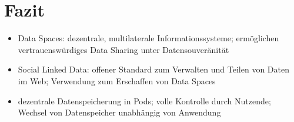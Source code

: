 
\section{Fazit}

\begin{itemize}

    \item Data Spaces: dezentrale, multilaterale Informationssysteme; ermöglichen vertrauenswürdiges Data Sharing unter Datensouveränität

    \item Social Linked Data: offener Standard zum Verwalten und Teilen von Daten im Web; Verwendung zum Erschaffen von Data Spaces
    
    \item dezentrale Datenspeicherung in Pods; volle Kontrolle durch Nutzende; Wechsel von Datenspeicher unabhängig von Anwendung
    
    
    
\end{itemize}
